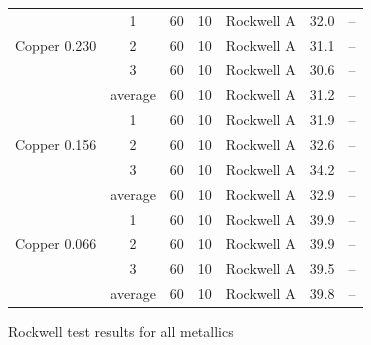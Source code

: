 \documentclass{article}
\begin{document}
\begin{figure}[H]
\begin{tabular}{c || c | c | c | c | c | c }
   & 1 & 60 & 10 & Rockwell A & 32.0 & -- \\ 
Copper 0.230 & 2 & 60 & 10 & Rockwell A & 31.1 & -- \\ 
 & 3 & 60 & 10 & Rockwell A & 30.6 & -- \\
 & average & 60 & 10 & Rockwell A & 31.2 & --\\ \hline
 
   & 1 & 60 & 10 & Rockwell A & 31.9 & -- \\ 
Copper 0.156 & 2 & 60 & 10 & Rockwell A & 32.6 & -- \\ 
 & 3 & 60 & 10 & Rockwell A & 34.2 & -- \\
 & average & 60 & 10 & Rockwell A & 32.9 & --\\ \hline
 
   & 1 & 60 & 10 & Rockwell A & 39.9 & -- \\ 
Copper 0.066 & 2 & 60 & 10 & Rockwell A & 39.9 & -- \\ 
 & 3 & 60 & 10 & Rockwell A & 39.5 & -- \\
 & average & 60 & 10 & Rockwell A & 39.8 & --\\ \hline
\end{tabular}
\caption{Rockwell test results for all metallics}
\end{figure}
\end{document}
